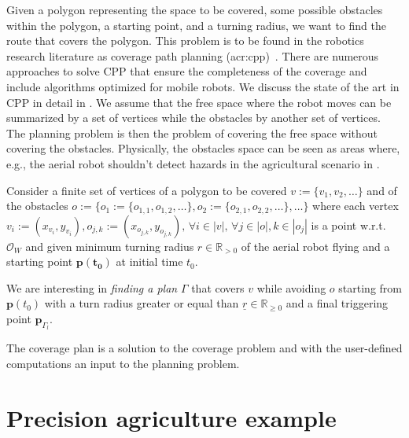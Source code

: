 Given a polygon representing the space to be covered, some possible obstacles within the polygon, a starting point, and a turning radius, we want to find the route that covers the polygon. This problem is to be found in the robotics research literature as coverage path planning (\Gls{acr:cpp})~\citep{choset1998coverage,choset2001coverage,galceran2013survey}. There are numerous approaches to solve CPP that ensure the completeness of the coverage and include algorithms optimized for mobile robots. We discuss the state of the art in CPP in detail in . We assume that the free space where the robot moves can be summarized by a set of vertices while the obstacles by another set of vertices. The planning problem is then the problem of covering the free space without covering the obstacles. Physically, the obstacles space can be seen as areas where, e.g., the aerial robot shouldn't detect hazards in the agricultural scenario in .

\begin{highlight}
  \begin{pb}\label{pb:cov-pb}
    Consider a finite set of vertices of a polygon to be covered $v:=\{v_1,v_2,\dots\}$ and of the obstacles $o:=\{o_1:=\{o_{1,1},o_{1,2},\dots\},o_2:=\{o_{2,1},o_{2,2},\dots\},\dots\}$ where each vertex $v_i:=(x_{v_i},y_{v_i}),o_{j,k}:=(x_{o_{j,k}},y_{o_{j,k}}),\,\forall i\in|v|,\,\forall j\in|o|,k\in|o_j|$ is a point w.r.t. $\mathcal{O}_W$ and given minimum turning radius $r\in\mathbb{R}_{>0}$ of the aerial robot flying and a starting point $\mathbf{p(t_0)}$ at initial time $t_0$.

    We are interesting in \textit{finding a plan} $\Gamma$ that covers $v$ while avoiding $o$ starting from $\mathbf{p}(t_0)$ with a turn radius greater or equal than $\underline{r}\in\mathbb{R}_{\geq 0}$ and a final triggering point $\mathbf{p}_{\Gamma_l}$.
  \end{pb}    
\end{highlight}

The coverage plan is a solution to the coverage problem and with the user-defined computations an input to the planning problem.


\section{Precision agriculture example}
\label{sec:flight-plan}

